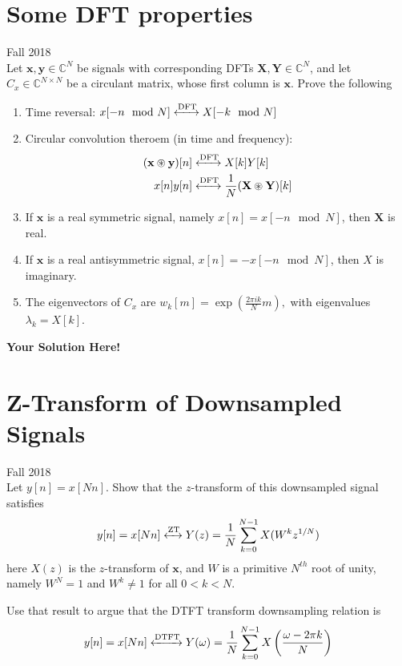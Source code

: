 \documentclass[12pt]{article}
\newcommand{\x}{\mathbf{x}}
\newcommand{\y}{\mathbf{y}}
\newcommand{\0}{\mathbf{0}}
\newcommand{\1}{\mathbf{1}}
\newcommand{\X}{\mathbf{X}}
\newcommand{\Y}{\mathbf{Y}}
\newcommand{\DTFT}{\xleftrightarrow{\text{DTFT}}}
\newcommand{\DFT}{\xleftrightarrow{\text{DFT}}}
\newcommand{\ZT}{\xleftrightarrow{\text{ZT}}}
\newcommand{\solspace}{\vspace{3mm} \textbf{Your Solution Here!} \vspace{3mm}}
\begin{document}
\rhead{\today}
 
\section{Some DFT properties}
Fall 2018\\
Let $\x,\y \in \mathbb{C}^N$ be signals with corresponding DFTs $\X, \Y \in \mathbb{C}^N$, and let $C_x \in \mathbb{C}^{N \times N}$ be a circulant matrix, whose first column is $\x$. 
Prove the following
\begin{enumerate}
    \item Time reversal: $x[-n \mod N] \DFT X[-k \mod N]$
    \item Circular convolution theroem (in time and frequency):
        \begin{align*}
            (\x \circledast \y)[n] &\DFT X[k]Y[k] \\
            x[n]y[n] &\DFT \frac{1}{N}(\X \circledast \Y)[k]
        \end{align*}
    \item If $\x$ is a real symmetric signal, namely $x[n] = x[-n \mod N]$, then $\X$ is real.
    \item If $\x$ is a real antisymmetric signal, $x[n] = -x[-n \mod N]$, then $X$ is imaginary.
    \item The eigenvectors of $C_x$ are $w_k[m] = \exp(\frac{2\pi i k}{N}m),$ with eigenvalues $\lambda_k = X[k]$.
\end{enumerate}

\solspace

\pagebreak

\section{Z-Transform of Downsampled Signals}
Fall 2018\\
Let $y[n] = x[Nn]$. Show that the $z$-transform of this downsampled signal satisfies
\begin{equation}
    y[n] = x[Nn] \ZT Y(z) = \frac{1}{N}\sum_{k=0}^{N-1} X(W^k z^{1/N})
\end{equation}
here $X(z)$ is the $z$-transform of $\x$, and $W$ is a primitive $N^{th}$ root of unity, namely $W^N = 1$ and $W^k \neq 1$ for all $0 < k < N$.

Use that result to argue that the DTFT transform downsampling relation is
\begin{equation}
    y[n] = x[Nn]  \DTFT Y(\omega) = \frac{1}{N} \sum_{k=0}^{N-1} X\left(\frac{\omega - 2\pi k}{N} \right)
\end{equation}
\end{document}
